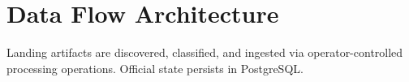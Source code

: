 \section{Data Flow Architecture}
Landing artifacts are discovered, classified, and ingested via operator-controlled processing operations. Official state persists in PostgreSQL.

